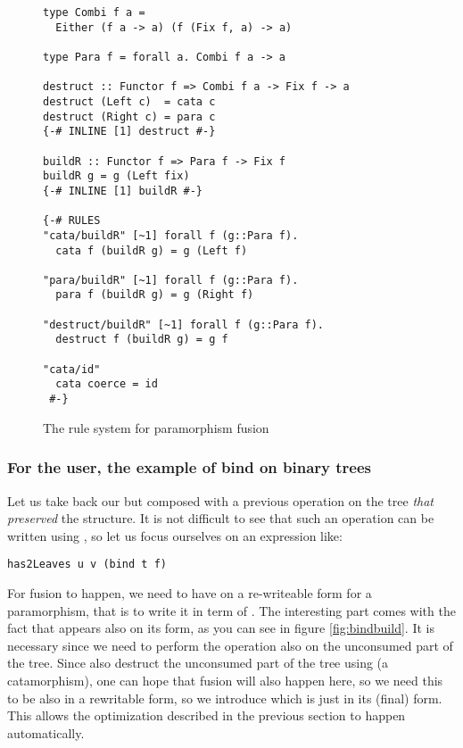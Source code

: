 \begin{figure}
\begin{verbatim}
type Combi f a =
  Either (f a -> a) (f (Fix f, a) -> a)

type Para f = forall a. Combi f a -> a

destruct :: Functor f => Combi f a -> Fix f -> a
destruct (Left c)  = cata c
destruct (Right c) = para c
{-# INLINE [1] destruct #-}

buildR :: Functor f => Para f -> Fix f
buildR g = g (Left fix)
{-# INLINE [1] buildR #-}

{-# RULES
"cata/buildR" [~1] forall f (g::Para f).
  cata f (buildR g) = g (Left f)

"para/buildR" [~1] forall f (g::Para f).
  para f (buildR g) = g (Right f)

"destruct/buildR" [~1] forall f (g::Para f).
  destruct f (buildR g) = g f

"cata/id"
  cata coerce = id
 #-}
\end{verbatim}
\caption{The rule system for paramorphism fusion}
\label{fig:para}
\end{figure}

\subsubsection{For the user, the example of bind on binary trees}
Let us take back our   but composed with a previous operation on the tree \emph{that preserved} the structure. It is not difficult to see that such an operation can be written using , so let us focus ourselves on an expression like:

\begin{verbatim}
has2Leaves u v (bind t f)
\end{verbatim}

\noindent For fusion to happen, we need to have  on a re-writeable form for a paramorphism, that is to write it in term of . The interesting part comes with the fact that  appears also on its  form, as you can see in figure \ref{fig:bindbuild}. It is necessary since we need to perform the  operation also on the unconsumed part of the tree. Since  also destruct the unconsumed part of the tree using  (a catamorphism), one can hope that fusion will also happen here, so we need this  to be also in a rewritable form, so we introduce  which is just  in its (final)  form. This allows the  optimization described in the previous section to happen automatically.

